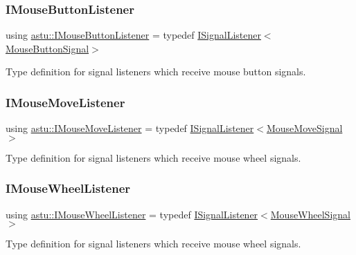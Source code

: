\subsubsection{\texorpdfstring{I\+Mouse\+Button\+Listener}{IMouseButtonListener}}
{\footnotesize\ttfamily using \hyperlink{group__input__group_ga8a311a2e19975ce6dca1696de117bd61}{astu\+::\+I\+Mouse\+Button\+Listener} = typedef \hyperlink{classastu_1_1ISignalListener}{I\+Signal\+Listener}$<$\hyperlink{classastu_1_1MouseButtonSignal}{Mouse\+Button\+Signal}$>$}

Type definition for signal listeners which receive mouse button signals. \mbox{\label{group__input__group_gac96f23d186368c518ef6ad649a49204d}} 
\subsubsection{\texorpdfstring{I\+Mouse\+Move\+Listener}{IMouseMoveListener}}
{\footnotesize\ttfamily using \hyperlink{group__input__group_gac96f23d186368c518ef6ad649a49204d}{astu\+::\+I\+Mouse\+Move\+Listener} = typedef \hyperlink{classastu_1_1ISignalListener}{I\+Signal\+Listener}$<$\hyperlink{classastu_1_1MouseMoveSignal}{Mouse\+Move\+Signal}$>$}

Type definition for signal listeners which receive mouse wheel signals. \mbox{\label{group__input__group_gafca8f2a610ab238ce3601915b0ece9b6}} 
\subsubsection{\texorpdfstring{I\+Mouse\+Wheel\+Listener}{IMouseWheelListener}}
{\footnotesize\ttfamily using \hyperlink{group__input__group_gafca8f2a610ab238ce3601915b0ece9b6}{astu\+::\+I\+Mouse\+Wheel\+Listener} = typedef \hyperlink{classastu_1_1ISignalListener}{I\+Signal\+Listener}$<$\hyperlink{classastu_1_1MouseWheelSignal}{Mouse\+Wheel\+Signal}$>$}

Type definition for signal listeners which receive mouse wheel signals. \mbox{\label{group__input__group_ga643e71e95d0724fed5787e35e83fc1dd}} 
